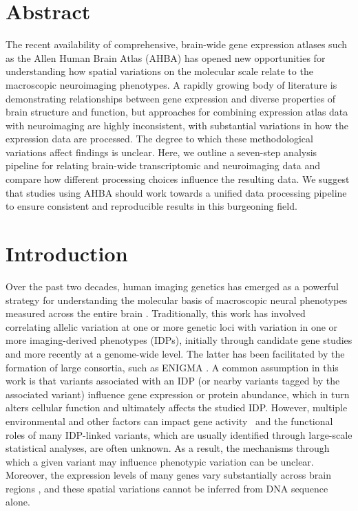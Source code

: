 \section*{Abstract}
The recent availability of comprehensive, brain-wide gene expression atlases such as the Allen Human Brain Atlas (AHBA) has opened new opportunities for understanding how spatial variations on the molecular scale relate to the macroscopic neuroimaging phenotypes. A rapidly growing body of literature is demonstrating relationships between gene expression and diverse properties of brain structure and function, but approaches for combining expression atlas data with neuroimaging are highly inconsistent, with substantial variations in how the expression data are processed. The degree to which these methodological variations affect findings is unclear. Here, we outline a seven-step analysis pipeline for relating brain-wide transcriptomic and neuroimaging data and compare how different processing choices influence the resulting data. We suggest that studies using AHBA should work towards a unified data processing pipeline to ensure consistent and reproducible results in this burgeoning field.

\section{Introduction}

Over the past two decades, human imaging genetics has emerged as a powerful strategy for understanding the molecular basis of macroscopic neural phenotypes measured across the entire brain \mbox{\citep{Meyer-Lindenberg2006a,Munoz2009,Arslan2015,Hashimoto2015}}. Traditionally, this work has involved correlating allelic variation at one or more genetic loci with variation in one or more imaging-derived phenotypes (IDPs), initially through candidate gene studies and more recently at a genome-wide level. The latter has been facilitated by the formation of large consortia, such as ENIGMA \citep{Thompson2014}. A common assumption in this work is that variants associated with an IDP (or nearby variants tagged by the associated variant) influence gene expression or protein abundance, which in turn alters cellular function and ultimately affects the studied IDP. However, multiple environmental and other factors can impact gene \mbox{activity \citep{Fraser2005,Choi2007,Cole2009}} and the functional roles of many IDP-linked variants, which are usually identified through large-scale statistical analyses, are often unknown. As a result, the mechanisms through which a given variant may influence phenotypic variation can be unclear. Moreover, the expression levels of many genes vary substantially across brain regions \mbox{\citep{Hawrylycz2015}}, and these spatial variations cannot be inferred from DNA sequence alone.

